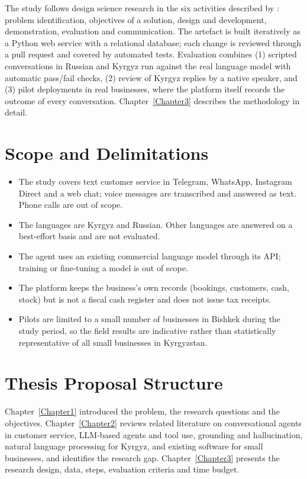 The study follows design science research \parencite{hevner2004design} in the six activities described by
\textcite{peffers2007design}: problem identification, objectives of a solution, design and development, demonstration,
evaluation and communication. The artefact is built iteratively as a Python web service with a relational database; each
change is reviewed through a pull request and covered by automated tests. Evaluation combines (1) scripted conversations
in Russian and Kyrgyz run against the real language model with automatic pass/fail checks, (2) review of Kyrgyz replies
by a native speaker, and (3) pilot deployments in real businesses, where the platform itself records the outcome of every
conversation. Chapter~\ref{Chapter3} describes the methodology in detail.

\section{Scope and Delimitations}

\begin{itemize}
	\item The study covers text customer service in Telegram, WhatsApp, Instagram Direct and a web chat; voice messages
	are transcribed and answered as text. Phone calls are out of scope.
	\item The languages are Kyrgyz and Russian. Other languages are answered on a best-effort basis and are not evaluated.
	\item The agent uses an existing commercial language model through its API; training or fine-tuning a model is out
	of scope.
	\item The platform keeps the business's own records (bookings, customers, cash, stock) but is not a fiscal cash
	register and does not issue tax receipts.
	\item Pilots are limited to a small number of businesses in Bishkek during the study period, so the field results are
	indicative rather than statistically representative of all small businesses in Kyrgyzstan.
\end{itemize}

\section{Thesis Proposal Structure}

Chapter~\ref{Chapter1} introduced the problem, the research questions and the objectives. Chapter~\ref{Chapter2} reviews
related literature on conversational agents in customer service, LLM-based agents and tool use, grounding and
hallucination, natural language processing for Kyrgyz, and existing software for small businesses, and identifies the
research gap. Chapter~\ref{Chapter3} presents the research design, data, steps, evaluation criteria and time budget.
